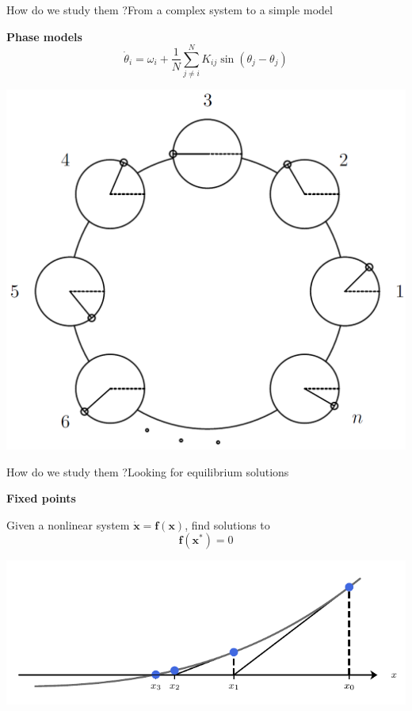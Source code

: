 \documentclass[usenames,dvipsnames,svgnames,10pt,aspectratio=169]{beamer}
\begin{document}
\begin{frame}[t, c]{How do we study them ?}{From a complex system to a simple model}
  \begin{minipage}{.48\textwidth}
    \centering
    \textbf{Phase models}
    \[
    \dot{\theta}_i = \omega_i + \dfrac{1}{N} \sum_{j \neq i}^N K_{ij} \sin(\theta_j - \theta_j)
    \]
  \end{minipage}%
  \hfill
  \begin{minipage}{.48\textwidth}
    \centering
    \includegraphics[width=\textwidth]{kuramoto}
  \end{minipage}

  \vspace{1cm}
\end{frame}

\begin{frame}[t, c]{How do we study them ?}{Looking for equilibrium solutions}
  \begin{minipage}{.38\textwidth}
    \centering
    \textbf{Fixed points}

    \medskip

    Given a nonlinear system $\dot{\bm{x}} = \bm{f}(\bm{x})$, find solutions to
    \[
    \bm{f}(\bm{x}^*) = 0
    \]
  \end{minipage}%
  \hfill
  \begin{minipage}{.58\textwidth}
    \centering
    \includegraphics[width=\textwidth]{Newton_method}
  \end{minipage}

  \vspace{1cm}
\end{frame}
\end{document}
